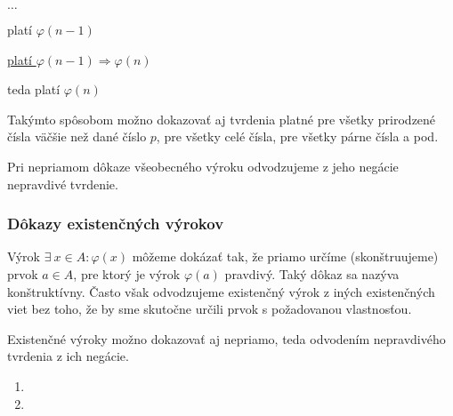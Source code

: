 \hspace{5cm} $\ldots$

\hspace{6cm} platí $\varphi (n - 1)$

\hspace{6cm} \underline{platí $\varphi (n - 1) \Rightarrow \varphi (n)$}

\hspace{7.2cm} teda platí $\varphi (n)$

Takýmto spôsobom možno dokazovať aj tvrdenia platné pre všetky prirodzené čísla
väčšie než dané číslo $p$, pre všetky celé čísla, pre všetky párne čísla a pod.

Pri nepriamom dôkaze všeobecného výroku odvodzujeme z jeho negácie nepravdivé
tvrdenie.

\medskip

\subsubsection*{Dôkazy existenčných výrokov}
Výrok $\exists ~ x \in A: \varphi (x)$
môžeme dokázať tak, že priamo určíme (skonštruujeme) prvok $a \in A$, pre ktorý
je výrok $\varphi (a)$ pravdivý. Taký dôkaz sa nazýva konštruktívny. Často však
odvodzujeme existenčný výrok z iných existenčných viet bez toho, že by sme
skutočne určili prvok s požadovanou vlastnosťou.

Existenčné výroky možno dokazovať aj nepriamo, teda odvodením nepravdivého
tvrdenia z ich negácie.

\begin{comment}
\begin{enumerate}
  \item Určte negácie následujúcich výrokov:

  \item Namiesto bodiek doplňte slová \enquote{je nutné}, \enquote{stačí},
        \enquote{je nutné a stačí} tak, aby vznikol pravdivý výrok:
  \begin{enumerate}[label=\arabic*.]
    \item aby súčet dvoch celých čísel bol deliteľný 2, $\ldots$ , aby každý
          sčítanec bol deliteľný 2;
    \item aby celé číslo bolo deliteľné 100, $\ldots$ , aby bolo deliteľné 10;
    \item aby celé číslo bolo deliteľné 100, $\ldots$ , aby bolo deliteľné
          1000;
    \item aby platila nerovnosť $\frac{1}{x} < 1, \ldots$ , aby bolo $x > 1$;
    \item aby platilo $\frac{1}{x} < 1, \ldots$ , aby bolo $x > 1$ alebo
          $x < 0$;
  \end{enumerate}
\end{enumerate}
\end{comment}

\begin{enumerate}
  \item {}
  \item {}
\end{enumerate}
